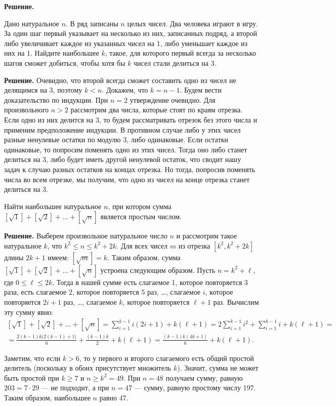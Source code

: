 \textbf{Решение.}

Дано натуральное $n$. В ряд записаны $n$ целых чисел. Два человека
играют в игру. За один шаг первый указывает на несколько из них,
записанных подряд, а второй либо увеличивает каждое из указанных чисел
на 1, либо уменьшает каждое из них на 1. Найдите наибольшее $k$, такое,
для которого первый всегда за несколько шагов сможет добиться, чтобы
хотя бы $k$ чисел стали делиться на 3.

\textbf{Решение.}
Очевидно, что второй всегда сможет составить одно из чисел не делящимся
на 3, поэтому $k<n$. Докажем, что $k=n-1$. Будем вести доказательство по
индукции. При $n=2$ утверждение очевидно. Для произвольного $n>2$
рассмотрим два числа, которые стоят по краям отрезка. Если одно из них
делится на 3, то будем рассматривать отрезок без этого числа и применим
предположение индукции. В противном случае либо у этих чисел разные
ненулевые остатки по модулю 3, либо одинаковые. Если остатки одинаковые,
то попросим поменять одно из этих чисел. Тогда оно либо станет делиться
на 3, либо будет иметь другой ненулевой остаток, что сводит нашу задач к
случаю разных остатков на концах отрезка. Но тогда, попросив поменять
числа во всем отрезке, мы получим, что одно из чисел на конце отрезка
станет делиться на 3.

Найти наибольшее натуральное $n$, при котором сумма
$[\sqrt{1}]+[\sqrt{2}]+\ldots+[\sqrt{n}]$ является простым числом.

\textbf{Решение.}
Выберем произвольное натуральное число $n$ и рассмотрим такое
натуральное $k$, что $k^2\leq n\leq k^2+2k$. Для всех чисел $m$ из
отрезка $[k^2, k^2+2k]$ длины $2k+1$ имеем: $[\sqrt{m}]=k$. Таким
образом, сумма $[\sqrt{1}]+[\sqrt{2}]+\ldots+[\sqrt{n}]$ устроена
следующим образом. Пусть $n=k^2+\ell$, где $0\leq\ell\leq 2k$. Тогда в
нашей сумме есть слагаемое 1, которое повторяется 3 раза, есть слагаемое
2, которое повторяется 5 раз, …, слагаемое $i$, которое повторяется
$2i+1$ раз, …, слагаемое $k$, которое повторяется $\ell+1$ раз. Вычислим
эту сумму явно: $$\begin{gathered}
[\sqrt{1}]+[\sqrt{2}]+\ldots+[\sqrt{n}] = \sum\limits_{i=1}^{k-1} i(2i+1)+k(\ell+1) = 2\sum\limits_{i=1}^{k-1} i^2+\sum\limits_{i=1}^{k-1} i + k(\ell+1) = \\ = \frac{2(k-1)k\big(2(k-1)+1\big)}{6}+\frac{(k-1)k}{2}+k(\ell+1) = \frac{(k-1)k(4k+1)}{6}+k(\ell+1).\end{gathered}$$

Заметим, что если $k>6$, то у первого и второго слагаемого есть общий
простой делитель (поскольку в обоих присутствует множитель $k$). Значит,
сумма не может быть простой при $k\geq 7$ и $n\geq k^2=49$. При $n=48$
получаем сумму, равную $203=7\cdot 29$ — не подходит, а при $n=47$ —
сумму, равную простому числу 197. Таким образом, наибольшее $n$ равно
47.

